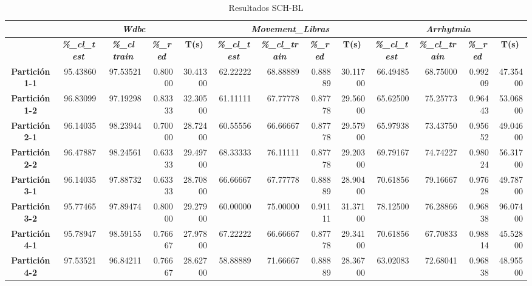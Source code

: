 \documentclass[a4paper,11pt]{article}
\begin{document}
 
 \begin{table}[H]	
  \caption{Resultados SCH-BL}
  \begin{adjustbox}{width=1.1\textwidth}
  \begin{tabular}{|c|r|r|r|r|r|r|r|r|r|r|r|r|}
  \hline
  \multicolumn{1}{|l|}{} & \multicolumn{ 4}{c|}{\textbf{\textit{Wdbc}}} & \multicolumn{ 4}{c|}{\textbf{\textit{Movement\_Libras}}} & \multicolumn{ 4}{c|}{\textbf{\textit{Arrhytmia}}} \\ \hline
  \multicolumn{1}{|l|}{} & \multicolumn{1}{c|}{\textbf{\textit{\%\_cl\_test}}} & \multicolumn{1}{c|}{\textbf{\textit{\%\_cl train}}} & \multicolumn{1}{c|}{\textbf{\textit{\%\_red}}} & \multicolumn{1}{c|}{\textbf{T(s)}} & \multicolumn{1}{c|}{\textbf{\textit{\%\_cl\_test}}} & \multicolumn{1}{c|}{\textbf{\textit{\%\_cl\_train}}} & \multicolumn{1}{c|}{\textbf{\textit{\%\_red}}} & \multicolumn{1}{c|}{\textbf{T(s)}} & \multicolumn{1}{c|}{\textbf{\textit{\%\_cl\_test}}} & \multicolumn{1}{c|}{\textbf{\textit{\%\_cl\_train}}} & \multicolumn{1}{c|}{\textbf{\textit{\%\_red}}} & \multicolumn{1}{c|}{\textbf{T(s)}} \\ \hline
  \textbf{Partición 1-1} & 95.43860 & 97.53521 & 0.80000 & 30.41300 & 62.22222 & 68.88889 & 0.88889 & 30.11700 & 66.49485 & 68.75000 & 0.99209 & 47.35400 \\ \hline
  \textbf{Partición 1-2} & 96.83099 & 97.19298 & 0.83333 & 32.30500 & 61.11111 & 67.77778 & 0.87778 & 29.56000 & 65.62500 & 75.25773 & 0.96443 & 53.06800 \\ \hline
  \textbf{Partición 2-1} & 96.14035 & 98.23944 & 0.70000 & 28.72400 & 60.55556 & 66.66667 & 0.87778 & 29.57900 & 65.97938 & 73.43750 & 0.95652 & 49.04600 \\ \hline
  \textbf{Partición 2-2} & 96.47887 & 98.24561 & 0.63333 & 29.49700 & 68.33333 & 76.11111 & 0.87778 & 29.20300 & 69.79167 & 74.74227 & 0.98024 & 56.31700 \\ \hline
  \textbf{Partición 3-1} & 96.14035 & 97.88732 & 0.63333 & 28.70800 & 66.66667 & 67.77778 & 0.88889 & 28.90400 & 70.61856 & 79.16667 & 0.97628 & 49.78700 \\ \hline
  \textbf{Partición 3-2} & 95.77465 & 97.89474 & 0.80000 & 29.27900 & 60.00000 & 75.00000 & 0.91111 & 31.37100 & 78.12500 & 76.28866 & 0.96838 & 96.07400 \\ \hline
  \textbf{Partición 4-1} & 95.78947 & 98.59155 & 0.76667 & 27.97800 & 67.22222 & 66.66667 & 0.87778 & 29.34100 & 70.61856 & 67.70833 & 0.98814 & 45.52800 \\ \hline
  \textbf{Partición 4-2} & 97.53521 & 96.84211 & 0.76667 & 28.62700 & 58.88889 & 71.66667 & 0.88889 & 28.36700 & 63.02083 & 72.68041 & 0.96838 & 48.95500 \\ \hline

\end{tabular}
\end{adjustbox}
\end{table}
\end{document}
